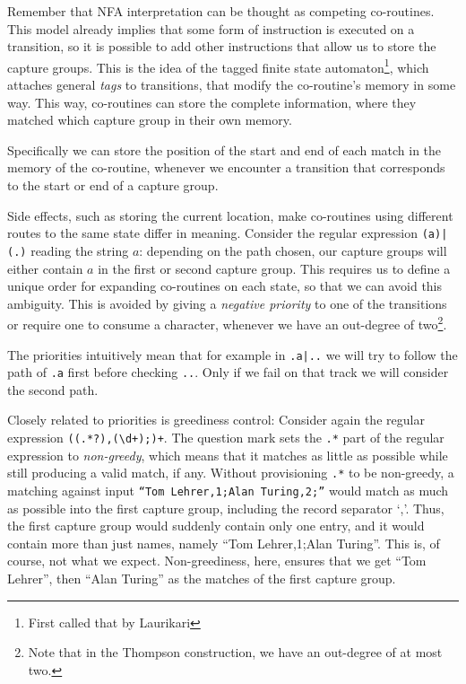 \documentclass[11pt,a4paper,twoside,openright]{Thesis}
\theoremstyle{definition}
\begin{document}
Remember that NFA interpretation can be thought as competing co-routines.
This model already implies that some form of instruction is executed on a 
transition, so it is possible to add other instructions that allow us to 
store the capture groups.
This is the idea of the tagged finite state
automaton\footnote{First called that by Laurikari\cite{Laur00a}}, which
attaches general \emph{tags} to transitions, that modify the co-routine's
memory in some way. This way, co-routines can store the complete information,
where they matched which capture group in their own memory.

Specifically we can store the position of the start and end of each 
match in the memory of the co-routine, whenever we encounter a transition 
that corresponds to the start or end of a capture group. 

Side effects, such as storing the current location, make co-routines using
different routes to the same state differ in meaning. Consider the regular
expression \texttt{(a)|(.)} reading the string $a$: depending on the path
chosen, our capture groups will either contain $a$ in the first or
second capture group. This requires us to define a unique order for expanding
co-routines on each state, so that we can avoid this ambiguity.
This is avoided by
giving a \emph{negative priority} to one of the transitions or require one to 
consume a character, whenever we have an out-degree of two\footnote{Note that
in the Thompson construction, we have an out-degree of at most two.}.

The priorities intuitively mean that for example in \texttt{.a|..} we will
try to follow the path of \texttt{.a} first before checking \texttt{..}.
Only if we fail on that track we will consider the second path.

Closely related to priorities is greediness control: Consider again the regular
expression \texttt{((.*?),(\textbackslash{}d+);)+}. The question mark sets the
\texttt{.*} part of the regular expression to \emph{non-greedy}, which means
that it matches as little as possible while still producing a valid match, if
any.  Without provisioning \texttt{.*} to be non-greedy, a matching against
input \texttt{``Tom Lehrer,1;Alan Turing,2;''} would match as much as possible
into the first capture group, including the record separator `,'.  Thus, the
first capture group would suddenly contain only one entry, and it would contain
more than just names, namely ``Tom Lehrer,1;Alan Turing''.  This is, of course,
not what we expect.  Non-greediness, here, ensures that we get ``Tom Lehrer'',
then ``Alan Turing'' as the matches of the first capture group.
\end{document}
